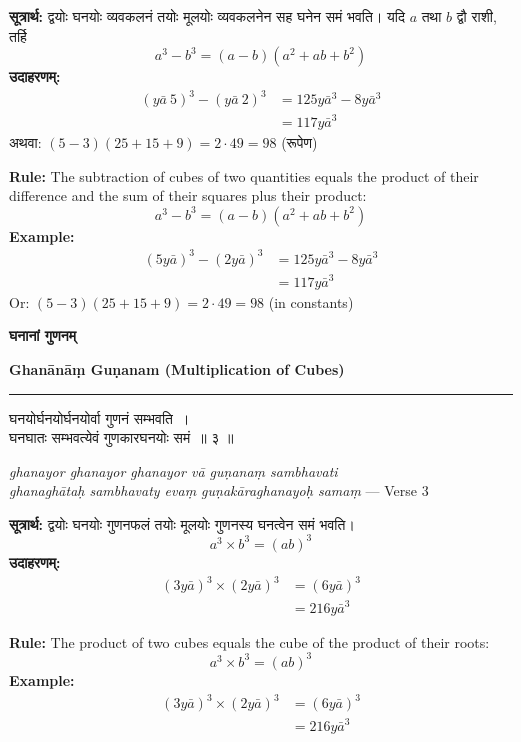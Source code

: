 \documentclass[11pt,a4paper]{article}
\newcommand{\dev}[1]{{\devanagarifont #1}}
\newcommand{\bicol}[2]{%
\noindent%
\begin{minipage}[t]{0.48\textwidth}
\begin{flushleft}
\small
#1
\end{flushleft}
\end{minipage}%
\hfill%
\begin{minipage}[t]{0.48\textwidth}
\begin{flushleft}
\small
#2
\end{flushleft}
\end{minipage}%
\vspace{0.4em}
}
\newcommand{\bicolverse}[2]{%
\par\noindent%
\begin{minipage}[t]{0.48\textwidth}
\centering
\color{versecolor}
\devanagarifont
\small
#1
\end{minipage}%
\hfill%
\begin{minipage}[t]{0.48\textwidth}
\centering
\color{versecolor}
\small
#2
\end{minipage}%
\par\vspace{0.4em}
}
\newcommand{\sectionbicol}[2]{%
\vspace{0.5em}
\noindent%
\begin{minipage}[t]{0.48\textwidth}
\begin{center}
\large\bfseries\color{sectioncolor}
\dev{#1}
\end{center}
\end{minipage}%
\hfill%
\begin{minipage}[t]{0.48\textwidth}
\begin{center}
\large\bfseries\color{sectioncolor}
#2
\end{center}
\end{minipage}%
\vspace{0.3em}
\noindent\rule{\textwidth}{0.4pt}
}
\begin{document}
\bicol{%
\textbf{सूत्रार्थ:} द्वयोः घनयोः व्यवकलनं तयोः मूलयोः व्यवकलनेन सह घनेन समं भवति। यदि $a$ तथा $b$ द्वौ राशी, तर्हि
\[a^3 - b^3 = (a-b)(a^2 + ab + b^2)\]
\textbf{उदाहरणम्:}
\begin{align*}
(y\bar{a}\ 5)^3 - (y\bar{a}\ 2)^3 &= 125y\bar{a}^3 - 8y\bar{a}^3 \\
&= 117y\bar{a}^3
\end{align*}
अथवा: $(5-3)(25 + 15 + 9) = 2 \cdot 49 = 98$ (रूपेण)
}{%
\textbf{Rule:} The subtraction of cubes of two quantities equals the product of their difference and the sum of their squares plus their product:
\[a^3 - b^3 = (a-b)(a^2 + ab + b^2)\]
\textbf{Example:}
\begin{align*}
(5y\bar{a})^3 - (2y\bar{a})^3 &= 125y\bar{a}^3 - 8y\bar{a}^3 \\
&= 117y\bar{a}^3
\end{align*}
Or: $(5-3)(25 + 15 + 9) = 2 \cdot 49 = 98$ (in constants)
}

\clearpage

\sectionbicol{घनानां गुणनम्}{Ghan\={a}n\={a}\d{m} Gu\d{n}anam (Multiplication of Cubes)}

\vspace{0.3cm}

\bicolverse{%
घनयोर्घनयोर्घनयोर्वा गुणनं सम्भवति~।\\
घनघातः सम्भवत्येवं गुणकारघनयोः समं~॥ ३ ॥
}{%
\textit{ghanayor ghanayor ghanayor v\={a} gu\d{n}ana\d{m} sambhavati}\\
\textit{ghanagh\={a}ta\d{h} sambhavaty eva\d{m} gu\d{n}ak\={a}raghanayo\d{h} sama\d{m}} --- Verse 3
}

\vspace{0.5cm}

\bicol{%
\textbf{सूत्रार्थ:} द्वयोः घनयोः गुणनफलं तयोः मूलयोः गुणनस्य घनत्वेन समं भवति।
\[a^3 \times b^3 = (ab)^3\]
\textbf{उदाहरणम्:}
\begin{align*}
(3y\bar{a})^3 \times (2y\bar{a})^3 &= (6y\bar{a})^3 \\
&= 216y\bar{a}^3
\end{align*}
}{%
\textbf{Rule:} The product of two cubes equals the cube of the product of their roots:
\[a^3 \times b^3 = (ab)^3\]
\textbf{Example:}
\begin{align*}
(3y\bar{a})^3 \times (2y\bar{a})^3 &= (6y\bar{a})^3 \\
&= 216y\bar{a}^3
\end{align*}
}
\end{document}
